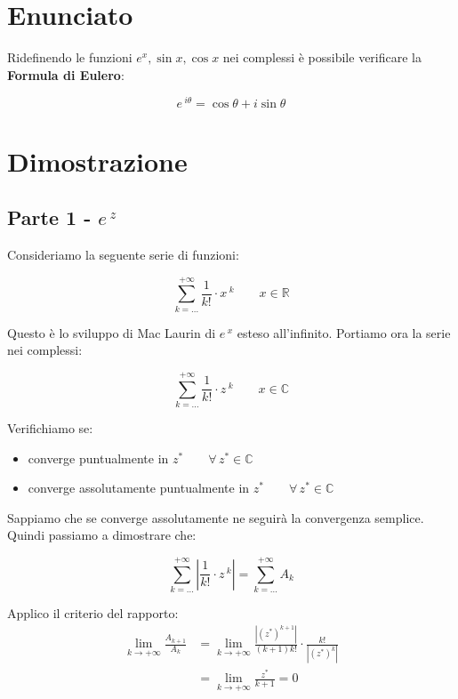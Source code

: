\documentclass[../dimostrazioni]{subfiles}
\begin{document}
        \section*{Enunciato}

            Ridefinendo le funzioni \( e^x, \sin x, \cos x \) nei complessi è possibile verificare la \textbf{Formula di Eulero}:

                \[  e\,^{i\theta} = \cos \theta + i \sin \theta \]

        \section*{Dimostrazione}

            \subsection*{Parte 1 - \(e\,^z\)}    

                Consideriamo la seguente serie di funzioni:
            
                \[  \sum_{k=\dots}^{+\infty} \frac{1}{k!} \cdot x\,^k \qquad x \in \mathbb{R}  \]

                Questo è lo sviluppo di Mac Laurin di \(e\,^x\) esteso all'infinito. Portiamo ora la serie nei complessi:

                \[  \sum_{k=\dots}^{+\infty} \frac{1}{k!} \cdot z\,^k \qquad x \in \mathbb{C}  \]

                Verifichiamo se:
                \begin{itemize}
                    \item converge puntualmente in \(z^* \qquad \forall \, z^*  \in \mathbb{C}\)
                    \item converge assolutamente puntualmente in \(z^* \qquad \forall \, z^*  \in \mathbb{C}\)
                \end{itemize}
            
                Sappiamo che se converge assolutamente ne seguirà la convergenza semplice. Quindi passiamo a dimostrare che:

                \[  \sum_{k=\dots}^{+\infty} \left| \frac{1}{k!} \cdot z\,^k \right| = \sum_{k=\dots}^{+\infty} A_k \]

                Applico il criterio del rapporto: %
                \begin{align*}
                    \lim_{k \to +\infty} \frac{A_{k+1}}{A_k} &= \lim_{k \to +\infty} \frac{\left|(z^*)^{k+1}\right|}{(k+1)k!} \cdot \frac{k!}{\left|(z^*)^k\right|} \\
                    &= \lim_{k \to +\infty} \frac{z^*}{k+1} = 0
                \end{align*}
\end{document}
